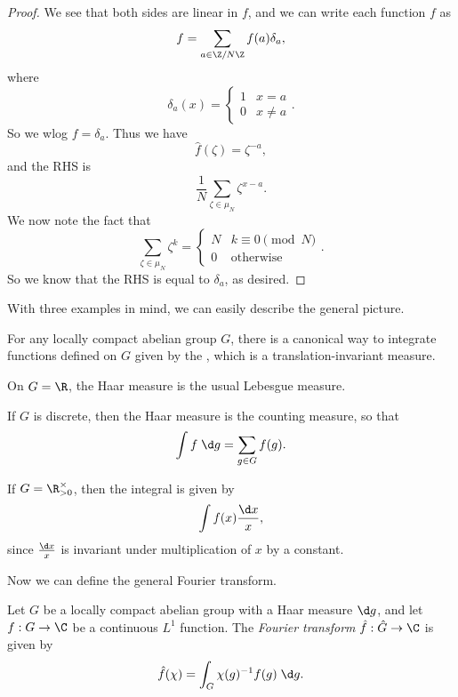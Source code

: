 \documentclass[a4paper]{article}
\begin{document}
\begin{proof}
  We see that both sides are linear in $f$, and we can write each function $f$ as
  \[
    f = \sum_{a \in \Z/N\Z} f(a) \delta_a,
  \]
  where
  \[
    \delta_a(x) =
    \begin{cases}
      1 & x = a\\
      0 & x \not= a
    \end{cases}.
  \]
  So we wlog $f = \delta_a$. Thus we have
  \[
    \hat{f}(\zeta) = \zeta^{-a},
  \]
  and the RHS is
  \[
    \frac{1}{N} \sum_{\zeta \in \mu_N} \zeta^{x - a}.
  \]
  We now note the fact that
  \[
    \sum_{\zeta \in \mu_N} \zeta^k =
    \begin{cases}
      N & k \equiv 0 \pmod N\\
      0 & \text{otherwise}
    \end{cases}.
  \]
  So we know that the RHS is equal to $\delta_a$, as desired.
\end{proof}
With three examples in mind, we can easily describe the general picture.

For any locally compact abelian group $G$, there is a canonical way to integrate functions defined on $G$ given by the , which is a translation-invariant measure.

\begin{eg}
  On $G = \R$, the Haar measure is the usual Lebesgue measure.
\end{eg}

\begin{eg}
  If $G$ is discrete, then the Haar measure is the counting measure, so that
  \[
    \int f\;\d g = \sum_{g \in G} f(g).
  \]
\end{eg}

\begin{eg}
  If $G = \R_{> 0}^\times$, then the integral is given by
  \[
    \int f(x) \frac{\d x}{x},
  \]
  since $\frac{\d x}{x}$ is invariant under multiplication of $x$ by a constant.
\end{eg}

Now we can define the general Fourier transform.
\begin{defi}
  Let $G$ be a locally compact abelian group with a Haar measure $\d g$, and let $f: G \to \C$ be a continuous $L^1$ function. The \emph{Fourier transform} $\hat{f}: \hat{G} \to \C$ is given by
  \[
    \hat{f}(\chi) = \int_G \chi(g)^{-1}f(g) \;\d g.
  \]
\end{defi}
\end{document}
